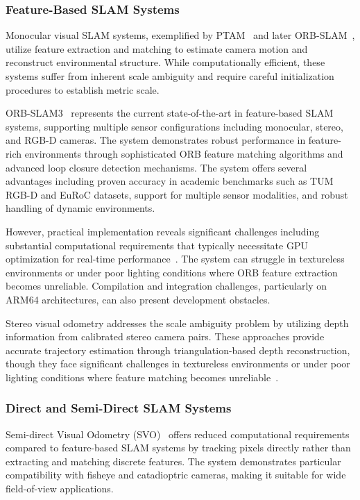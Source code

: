 \subsubsection{Feature-Based SLAM Systems}
Monocular visual SLAM systems, exemplified by PTAM~\cite{klein2007parallel} and later ORB-SLAM~\cite{mur2015orb}, utilize feature extraction and matching to estimate camera motion and reconstruct environmental structure. While computationally efficient, these systems suffer from inherent scale ambiguity and require careful initialization procedures to establish metric scale.

ORB-SLAM3~\cite{campos2021orbslam3} represents the current state-of-the-art in feature-based SLAM systems, supporting multiple sensor configurations including monocular, stereo, and RGB-D cameras. The system demonstrates robust performance in feature-rich environments through sophisticated ORB feature matching algorithms and advanced loop closure detection mechanisms. The system offers several advantages including proven accuracy in academic benchmarks such as TUM RGB-D and EuRoC datasets, support for multiple sensor modalities, and robust handling of dynamic environments.

However, practical implementation reveals significant challenges including substantial computational requirements that typically necessitate GPU optimization for real-time performance~\cite{huang2021sensor}. The system can struggle in textureless environments or under poor lighting conditions where ORB feature extraction becomes unreliable. Compilation and integration challenges, particularly on ARM64 architectures, can also present development obstacles.

Stereo visual odometry addresses the scale ambiguity problem by utilizing depth information from calibrated stereo camera pairs. These approaches provide accurate trajectory estimation through triangulation-based depth reconstruction, though they face significant challenges in textureless environments or under poor lighting conditions where feature matching becomes unreliable~\cite{geiger2011stereoscan}.

\subsubsection{Direct and Semi-Direct SLAM Systems}
Semi-direct Visual Odometry (SVO)~\cite{forster2014svo} offers reduced computational requirements compared to feature-based SLAM systems by tracking pixels directly rather than extracting and matching discrete features. The system demonstrates particular compatibility with fisheye and catadioptric cameras, making it suitable for wide field-of-view applications.

